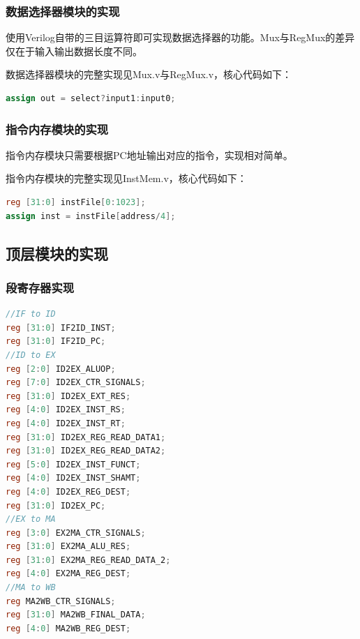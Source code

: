 \documentclass[UTF8]{ctexart}
\begin{document}
\subsubsection{数据选择器模块的实现}
    使用Verilog自带的三目运算符即可实现数据选择器的功能。Mux与RegMux的差异仅在于输入输出数据长度不同。\par
    数据选择器模块的完整实现见Mux.v与RegMux.v，核心代码如下：
\begin{lstlisting}[language=verilog]
assign out = select?input1:input0;
\end{lstlisting}

\subsubsection{指令内存模块的实现}
    指令内存模块只需要根据PC地址输出对应的指令，实现相对简单。\par
    指令内存模块的完整实现见InstMem.v，核心代码如下：
\begin{lstlisting}[language=verilog]
reg [31:0] instFile[0:1023];
assign inst = instFile[address/4];
\end{lstlisting}

\subsection{顶层模块的实现}

\subsubsection{段寄存器实现}
\begin{lstlisting}[language=verilog]
//IF to ID
reg [31:0] IF2ID_INST;
reg [31:0] IF2ID_PC;
//ID to EX
reg [2:0] ID2EX_ALUOP;
reg [7:0] ID2EX_CTR_SIGNALS;
reg [31:0] ID2EX_EXT_RES;
reg [4:0] ID2EX_INST_RS;
reg [4:0] ID2EX_INST_RT;
reg [31:0] ID2EX_REG_READ_DATA1;
reg [31:0] ID2EX_REG_READ_DATA2;
reg [5:0] ID2EX_INST_FUNCT;
reg [4:0] ID2EX_INST_SHAMT;
reg [4:0] ID2EX_REG_DEST;
reg [31:0] ID2EX_PC;
//EX to MA
reg [3:0] EX2MA_CTR_SIGNALS;
reg [31:0] EX2MA_ALU_RES;
reg [31:0] EX2MA_REG_READ_DATA_2;
reg [4:0] EX2MA_REG_DEST;
//MA to WB
reg MA2WB_CTR_SIGNALS;
reg [31:0] MA2WB_FINAL_DATA;
reg [4:0] MA2WB_REG_DEST;
\end{lstlisting}
\end{document}
